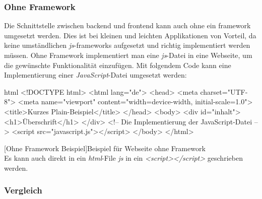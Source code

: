 \subsubsection{Ohne Framework}
Die Schnittstelle zwischen \Gls{backend} und \Gls{frontend} kann auch ohne ein \Gls{framework} umgesetzt werden. Dies ist bei kleinen und leichten Applikationen von Vorteil, da keine umständlichen \textit{\Gls{js}}-\Gls{framework}s aufgesetzt und richtig implementiert werden müssen. Ohne Framework implementiert man eine \textit{\Gls{js}}-Datei in eine Webseite, um die gewünschte Funktionalität einzufügen. Mit folgendem Code kann eine Implementierung einer \textit{JavaScript}-Datei umgesetzt werden:
\begin{code}{html}
	<!DOCTYPE html>
	<html lang="de">
		<head>
			<meta charset="UTF-8">
			<meta name="viewport" content="width=device-width, initial-scale=1.0">
			<title>Kurzes Plain-Beispiel</title>
		</head>
		<body>
			<div id="inhalt">
				<h1>Überschrift</h1>
			</div>
			<!-- Die Implementierung der JavaScript-Datei -->
			<script src="javascript.js"></script>
		</body>
	</html>
\end{code}
[Ohne Framework Beispiel]{Beispiel für Webseite ohne Framework}~\\
Es kann auch direkt in ein \textit{\Gls{html}}-File \textit{\Gls{js}} in ein \textit{<script></script>} geschrieben werden.
\newpage
\subsubsection{Vergleich}

